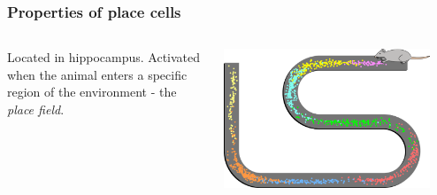 \documentclass[mathserif]{beamer}
\begin{document}
%
%
%
\begin{frame}
\frametitle{Properties of place cells}
\begin{columns}[T]
    \begin{column}{.5\textwidth}
			Located in hippocampus. Activated when the animal enters a specific region of the environment - the \textit{place field}.
    \end{column}
    \begin{column}{.5\textwidth}
    \includegraphics[width=0.9\textwidth]{Place_Cell_Spiking_Activity_Example.png}
    \end{column}
  \end{columns}	
\end{frame}
%
%
%
\end{document}
